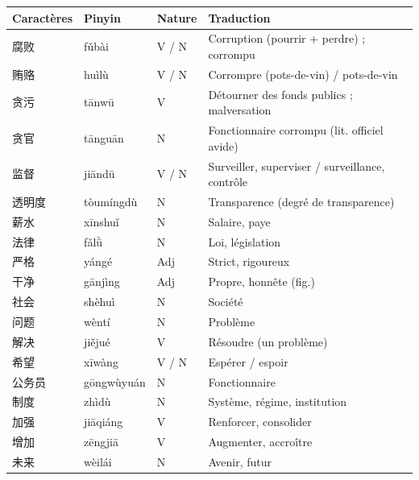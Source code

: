 \documentclass[11pt]{article}
\begin{document}
\begin{definition}
\begin{center}
\begin{tabularx}{\linewidth}{|X|X|X|X|}
\hline
\rowcolor{popblueL} \textbf{Caractères} & \textbf{Pinyin} & \textbf{Nature} & \textbf{Traduction} \\ \hline
腐败 & fǔbài & V / N & Corruption (pourrir + perdre) ; corrompu \\ \hline
贿赂 & huìlù & V / N & Corrompre (pots-de-vin) / pots-de-vin \\ \hline
贪污 & tānwū & V & Détourner des fonds publics ; malversation \\ \hline
贪官 & tānguān & N & Fonctionnaire corrompu (lit. officiel avide) \\ \hline
监督 & jiāndū & V / N & Surveiller, superviser / surveillance, contrôle \\ \hline
透明度 & tòumíngdù & N & Transparence (degré de transparence) \\ \hline
薪水 & xīnshuǐ & N & Salaire, paye \\ \hline
法律 & fǎlǜ & N & Loi, législation \\ \hline
严格 & yángé & Adj & Strict, rigoureux \\ \hline
干净 & gānjìng & Adj & Propre, honnête (fig.) \\ \hline
社会 & shèhuì & N & Société \\ \hline
问题 & wèntí & N & Problème \\ \hline
解决 & jiějué & V & Résoudre (un problème) \\ \hline
希望 & xīwàng & V / N & Espérer / espoir \\ \hline
公务员 & gōngwùyuán & N & Fonctionnaire \\ \hline
制度 & zhìdù & N & Système, régime, institution \\ \hline
加强 & jiāqiáng & V & Renforcer, consolider \\ \hline
增加 & zēngjiā & V & Augmenter, accroître \\ \hline
未来 & wèilái & N & Avenir, futur \\ \hline
\end{tabularx}
\end{center}
\end{definition}
\end{document}
